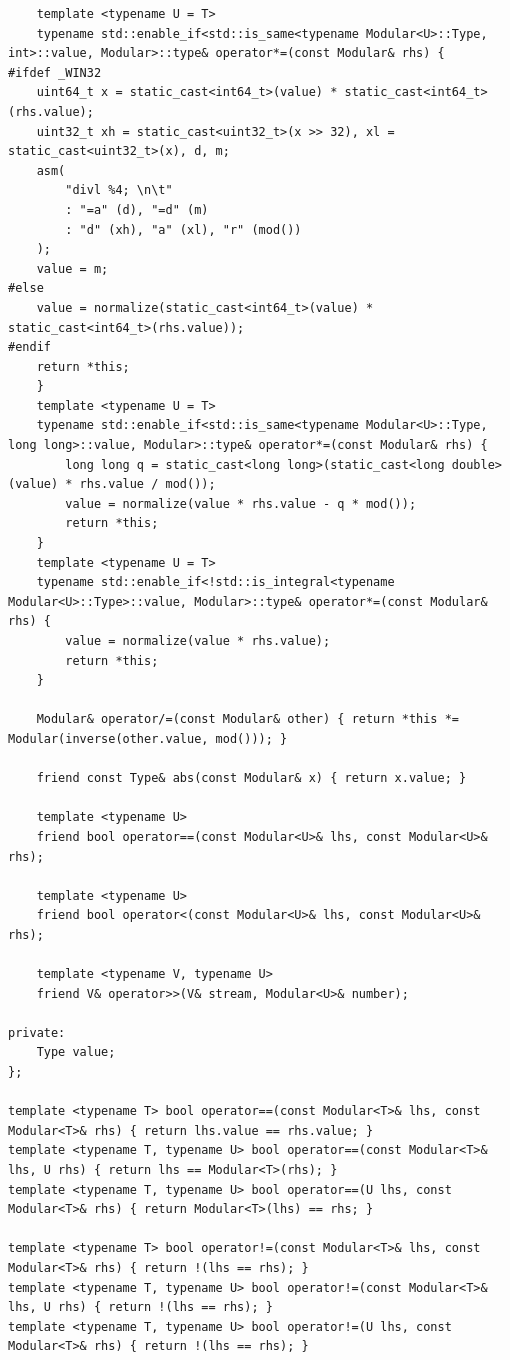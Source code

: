 \documentclass[twoside]{article}
\begin{document}
\begin{lstlisting}
    template <typename U = T>
    typename std::enable_if<std::is_same<typename Modular<U>::Type, int>::value, Modular>::type& operator*=(const Modular& rhs) {
#ifdef _WIN32
    uint64_t x = static_cast<int64_t>(value) * static_cast<int64_t>(rhs.value);
    uint32_t xh = static_cast<uint32_t>(x >> 32), xl = static_cast<uint32_t>(x), d, m;
    asm(
        "divl %4; \n\t"
        : "=a" (d), "=d" (m)
        : "d" (xh), "a" (xl), "r" (mod())
    );
    value = m;
#else
    value = normalize(static_cast<int64_t>(value) * static_cast<int64_t>(rhs.value));
#endif
    return *this;
    }
    template <typename U = T>
    typename std::enable_if<std::is_same<typename Modular<U>::Type, long long>::value, Modular>::type& operator*=(const Modular& rhs) {
        long long q = static_cast<long long>(static_cast<long double>(value) * rhs.value / mod());
        value = normalize(value * rhs.value - q * mod());
        return *this;
    }
    template <typename U = T>
    typename std::enable_if<!std::is_integral<typename Modular<U>::Type>::value, Modular>::type& operator*=(const Modular& rhs) {
        value = normalize(value * rhs.value);
        return *this;
    }
 
    Modular& operator/=(const Modular& other) { return *this *= Modular(inverse(other.value, mod())); }
 
    friend const Type& abs(const Modular& x) { return x.value; }
 
    template <typename U>
    friend bool operator==(const Modular<U>& lhs, const Modular<U>& rhs);
 
    template <typename U>
    friend bool operator<(const Modular<U>& lhs, const Modular<U>& rhs);
 
    template <typename V, typename U>
    friend V& operator>>(V& stream, Modular<U>& number);
 
private:
    Type value;
};
 
template <typename T> bool operator==(const Modular<T>& lhs, const Modular<T>& rhs) { return lhs.value == rhs.value; }
template <typename T, typename U> bool operator==(const Modular<T>& lhs, U rhs) { return lhs == Modular<T>(rhs); }
template <typename T, typename U> bool operator==(U lhs, const Modular<T>& rhs) { return Modular<T>(lhs) == rhs; }
 
template <typename T> bool operator!=(const Modular<T>& lhs, const Modular<T>& rhs) { return !(lhs == rhs); }
template <typename T, typename U> bool operator!=(const Modular<T>& lhs, U rhs) { return !(lhs == rhs); }
template <typename T, typename U> bool operator!=(U lhs, const Modular<T>& rhs) { return !(lhs == rhs); }
 

\end{lstlisting}
\end{document}
